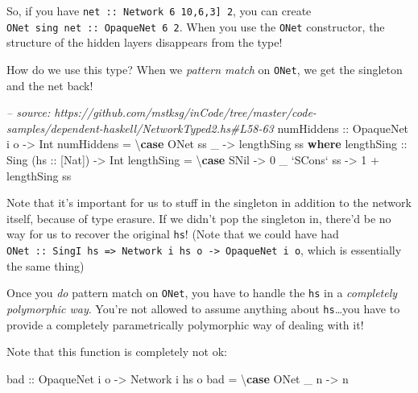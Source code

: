 \documentclass[]{article}
\newenvironment{Shaded}{}{}
\newcommand{\KeywordTok}[1]{\textcolor[rgb]{0.00,0.44,0.13}{\textbf{{#1}}}}
\newcommand{\DataTypeTok}[1]{\textcolor[rgb]{0.56,0.13,0.00}{{#1}}}
\newcommand{\DecValTok}[1]{\textcolor[rgb]{0.25,0.63,0.44}{{#1}}}
\newcommand{\CommentTok}[1]{\textcolor[rgb]{0.38,0.63,0.69}{\textit{{#1}}}}
\newcommand{\OtherTok}[1]{\textcolor[rgb]{0.00,0.44,0.13}{{#1}}}
\newcommand{\FunctionTok}[1]{\textcolor[rgb]{0.02,0.16,0.49}{{#1}}}
\newcommand{\NormalTok}[1]{{#1}}
\begin{document}
So, if you have \texttt{net\ ::\ Network\ 6\ \textquotesingle{}{[}10,6,3{]}\ 2},
you can create \texttt{ONet\ sing\ net\ ::\ OpaqueNet\ 6\ 2}. When you use the
\texttt{ONet} constructor, the structure of the hidden layers disappears from
the type!

How do we use this type? When we \emph{pattern match} on \texttt{ONet}, we get
the singleton and the net back!

\begin{Shaded}
\begin{Highlighting}[]
\CommentTok{-- source: https://github.com/mstksg/inCode/tree/master/code-samples/dependent-haskell/NetworkTyped2.hs#L58-63}
\OtherTok{numHiddens ::} \DataTypeTok{OpaqueNet} \NormalTok{i o }\OtherTok{->} \DataTypeTok{Int}
\NormalTok{numHiddens }\FunctionTok{=} \NormalTok{\textbackslash{}}\KeywordTok{case} \DataTypeTok{ONet} \NormalTok{ss _ }\OtherTok{->} \NormalTok{lengthSing ss}
  \KeywordTok{where}
\OtherTok{    lengthSing ::} \DataTypeTok{Sing} \NormalTok{(}\OtherTok{hs ::} \NormalTok{[}\DataTypeTok{Nat}\NormalTok{]) }\OtherTok{->} \DataTypeTok{Int}
    \NormalTok{lengthSing }\FunctionTok{=} \NormalTok{\textbackslash{}}\KeywordTok{case} \DataTypeTok{SNil}         \OtherTok{->} \DecValTok{0}
                       \NormalTok{_ }\OtherTok{`SCons`} \NormalTok{ss }\OtherTok{->} \DecValTok{1} \FunctionTok{+} \NormalTok{lengthSing ss}
\end{Highlighting}
\end{Shaded}

Note that it's important for us to stuff in the singleton in addition to the
network itself, because of type erasure. If we didn't pop the singleton in,
there'd be no way for us to recover the original \texttt{hs}! (Note that we
could have had
\texttt{ONet\ ::\ SingI\ hs\ =\textgreater{}\ Network\ i\ hs\ o\ -\textgreater{}\ OpaqueNet\ i\ o},
which is essentially the same thing)

Once you \emph{do} pattern match on \texttt{ONet}, you have to handle the
\texttt{hs} in a \emph{completely polymorphic way}. You're not allowed to assume
anything about \texttt{hs}\ldots{}you have to provide a completely
parametrically polymorphic way of dealing with it!

Note that this function is completely not ok:

\begin{Shaded}
\begin{Highlighting}[]
\OtherTok{bad ::} \DataTypeTok{OpaqueNet} \NormalTok{i o }\OtherTok{->} \DataTypeTok{Network} \NormalTok{i hs o}
\NormalTok{bad }\FunctionTok{=} \NormalTok{\textbackslash{}}\KeywordTok{case} \DataTypeTok{ONet} \NormalTok{_ n }\OtherTok{->} \NormalTok{n}
\end{Highlighting}
\end{Shaded}
\end{document}
